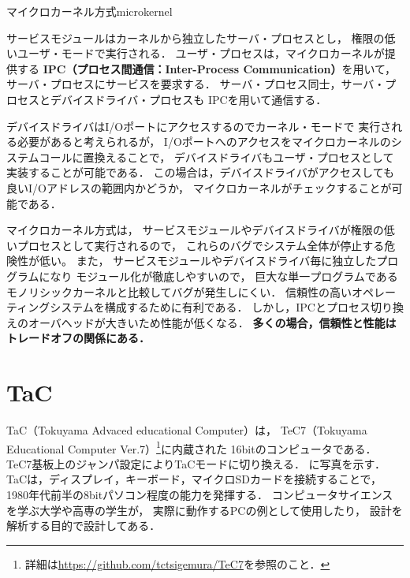 {マイクロカーネル方式}{microkernel}

サービスモジュールはカーネルから独立したサーバ・プロセスとし，
権限の低いユーザ・モードで実行される．
ユーザ・プロセスは，マイクロカーネルが提供する
{\bf IPC（プロセス間通信：Inter-Process Communication）}を用いて，
サーバ・プロセスにサービスを要求する．
サーバ・プロセス同士，サーバ・プロセスとデバイスドライバ・プロセスも
IPCを用いて通信する．

デバイスドライバはI/Oポートにアクセスするのでカーネル・モードで
実行される必要があると考えられるが，
I/Oポートへのアクセスをマイクロカーネルのシステムコールに置換えることで，
デバイスドライバもユーザ・プロセスとして実装することが可能である．
この場合は，デバイスドライバがアクセスしても良いI/Oアドレスの範囲内かどうか，
マイクロカーネルがチェックすることが可能である．

マイクロカーネル方式は，
サービスモジュールやデバイスドライバが権限の低いプロセスとして実行されるので，
これらのバグでシステム全体が停止する危険性が低い。
また，
サービスモジュールやデバイスドライバ毎に独立したプログラムになり
モジュール化が徹底しやすいので，
巨大な単一プログラムであるモノリシックカーネルと比較してバグが発生しにくい．
信頼性の高いオペレーティングシステムを構成するために有利である．
しかし，IPCとプロセス切り換えのオーバヘッドが大きいため性能が低くなる．
{\bf 多くの場合，信頼性と性能はトレードオフの関係にある．}

\section{TaC}
TaC（Tokuyama Advaced educational Computer）は，
TeC7（Tokuyama Educational Computer Ver.7）\footnote{
詳細は\url{https://github.com/tctsigemura/TeC7}を参照のこと．}に内蔵された
16bitのコンピュータである．
TeC7基板上のジャンパ設定によりTaCモードに切り換える．
に写真を示す．
TaCは，ディスプレイ，キーボード，マイクロSDカードを接続することで，
1980年代前半の8bitパソコン程度の能力を発揮する．
コンピュータサイエンスを学ぶ大学や高専の学生が，
実際に動作するPCの例として使用したり，
設計を解析する目的で設計してある．

